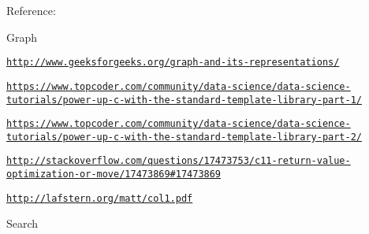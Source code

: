 Reference\-:

Graph


\begin{DoxyItemize}
\item \href{http://www.geeksforgeeks.org/graph-and-its-representations/}{\tt http\-://www.\-geeksforgeeks.\-org/graph-\/and-\/its-\/representations/}
\item \href{https://www.topcoder.com/community/data-science/data-science-tutorials/power-up-c-with-the-standard-template-library-part-1/}{\tt https\-://www.\-topcoder.\-com/community/data-\/science/data-\/science-\/tutorials/power-\/up-\/c-\/with-\/the-\/standard-\/template-\/library-\/part-\/1/}
\item \href{https://www.topcoder.com/community/data-science/data-science-tutorials/power-up-c-with-the-standard-template-library-part-2/}{\tt https\-://www.\-topcoder.\-com/community/data-\/science/data-\/science-\/tutorials/power-\/up-\/c-\/with-\/the-\/standard-\/template-\/library-\/part-\/2/}
\item \href{http://stackoverflow.com/questions/17473753/c11-return-value-optimization-or-move/17473869#17473869}{\tt http\-://stackoverflow.\-com/questions/17473753/c11-\/return-\/value-\/optimization-\/or-\/move/17473869\#17473869}
\item \href{http://lafstern.org/matt/col1.pdf}{\tt http\-://lafstern.\-org/matt/col1.\-pdf}
\end{DoxyItemize}

Search


